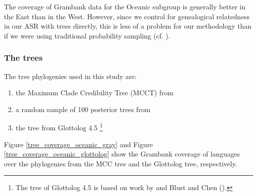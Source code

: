 \documentclass[12pt,letterpaper]{article}
\begin{document}
The coverage of Grambank data for the Oceanic subgroup is generally better in the East than in the West. However, since we control for genealogical relatedness in our ASR with trees directly, this is less of a problem for our methodology than if we were using traditional probability sampling (cf. \citealt{ross2004morphosyntactic}).

\FloatBarrier
\subsubsection{The trees}
\label{the_trees}
The tree phylogenies used in this study are: 

\begin{enumerate}[label=(\alph*)]
    \item the Maximum Clade Credibility Tree (MCCT) from \citet{grayetal_2009}
    \item a random sample of 100 posterior trees from \citet{grayetal_2009} 
    \item the tree from Glottolog 4.5 \citep{glottolog4_5}\footnote{The tree of Glottolog 4.5 \citep{glottolog4_5} is based on work by \citet{blust_2009, blust_2014} and Blust and Chen (\citeyear{blust_chen_2017}).}
\end{enumerate}

Figure \ref{tree_coverage_oceanic_gray} and Figure \ref{tree_coverage_oceanic_glottolog} show the Grambank coverage of languages over the phylogenies from the \citet{grayetal_2009} MCC tree and the Glottolog tree, respectively. 
\end{document}
